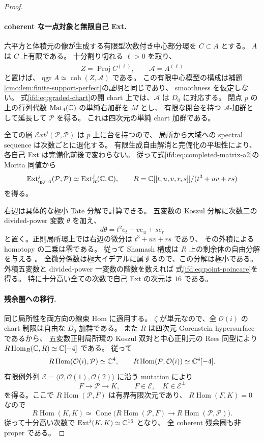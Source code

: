 \begin{proof}
\paragraph{coherent な一点対象と無限自己 Ext.}
六平方と体積元の像が生成する有限型次数付き中心部分環を $C\subset A$ とする。
$A$ は $C$ 上有限である。
十分割り切れる $\ell>0$ を取り、
\[
        Z=\operatorname{Proj}C^{(\ell)},\qquad
        \mathcal A=\widetilde{A^{(\ell)}}
\]
と置けば、$\operatorname{qgr}A\simeq\operatorname{coh}(Z,\mathcal A)$ である。
この有限中心模型の構成は補題\ref{cmo:lem:finite-support-perfect}の証明と同じであり、
smoothness を仮定しない。
式\eqref{ifd:eq:graded-chart}の開 chart 上では、$\mathcal A$ は $D_0$ に対応する。
閉点 $p$ の上の行列代数 $\operatorname{Mat}_4(\mathbb C)$ の単純右加群を $M$ とし、
有限な閉台を持つ $\mathcal A$-加群として延長して $\mathcal P$ を得る。
これは四次元の単純 chart 加群である。

全ての層 $\mathcal E xt^j(\mathcal P,\mathcal P)$ は $p$ 上に台を持つので、
局所から大域への spectral sequence は次数ごとに退化する。
有限生成自由解消と完備化の平坦性により、各自己 Ext は完備化前後で変わらない。
従って式\eqref{ifd:eq:completed-matrix-a2}の Morita 同値から
\[
 \operatorname{Ext}_{\operatorname{qgr}A}^j(\mathcal P,\mathcal P)
    \simeq \operatorname{Ext}_{R}^j(\mathbb C,\mathbb C),\qquad
 R=\mathbb C[[t,u,v,r,s]]/(t^3+uv+rs)
\]
を得る。

右辺は具体的な極小 Tate 分解で計算できる。
五変数の Koszul 分解に次数二の divided-power 変数 $\theta$ を加え、
\[
 d\theta=t^2e_t+v e_u+s e_r
\]
と置く。正則局所環上では右辺の微分は $t^3+uv+rs$ であり、
その外積による homotopy の二乗は零である。
従って Shamash 構成は $R$ 上の剰余体の自由分解を与える
\cite[Construction~4.1.3, Proposition~4.1.4, Remark~4.1.5]{CMOEisenbudPeeva}。
全微分係数は極大イデアルに属するので、この分解は極小である。
外積五変数と divided-power 一変数の階数を数えれば
式\eqref{ifd:eq:point-poincare}を得る。
特に十分高い全ての次数で自己 Ext の次元は $16$ である。

\paragraph{残余圏への移行.}
同じ局所性を両方向の線束 Hom に適用する。
$\zeta$ が単元なので、全 $\mathcal O(i)$ の chart 制限は自由な $D_0$-加群である。
また $R$ は四次元 Gorenstein hypersurface であるから、
五変数正則局所環の Koszul 双対と中心正則元の Rees 同型により
$R\operatorname{Hom}_R(\mathbb C,R)\simeq\mathbb C[-4]$ である。
従って
\[
 R\operatorname{Hom}(\mathcal O(i),\mathcal P)\simeq\mathbb C^4,
 \qquad
 R\operatorname{Hom}(\mathcal P,\mathcal O(i))\simeq\mathbb C^4[-4].
\]
有限例外列 $\mathcal E=\langle\mathcal O,\mathcal O(1),\mathcal O(2)\rangle$
に沿う mutation により
\[
        F\longrightarrow\mathcal P\longrightarrow K,
        \qquad F\in\mathcal E,\quad K\in\mathcal E^\perp
\]
を得る。ここで $R\operatorname{Hom}(\mathcal P,F)$ は有界有限次元であり、
$R\operatorname{Hom}(F,K)=0$ なので
\[
 R\operatorname{Hom}(K,K)\simeq
   \operatorname{Cone}\bigl(R\operatorname{Hom}(\mathcal P,F)
               \longrightarrow R\operatorname{Hom}(\mathcal P,\mathcal P)\bigr).
\]
従って十分高い次数で $\operatorname{Ext}^j(K,K)\simeq\mathbb C^{16}$ となり、
全 coherent 残余圏も非 proper である。


\end{proof}

